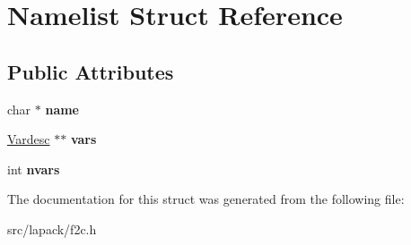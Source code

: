 \hypertarget{structNamelist}{\section{\-Namelist \-Struct \-Reference}
\label{structNamelist}
}
\subsection*{\-Public \-Attributes}
\begin{DoxyCompactItemize}
\item 
\hypertarget{structNamelist_a43f48d333d37610aa80483ee76c78d26}{char $\ast$ {\bfseries name}}\label{structNamelist_a43f48d333d37610aa80483ee76c78d26}

\item 
\hypertarget{structNamelist_a5e41f1eccfc8b25536f76c1ced89c3fc}{\hyperlink{structVardesc}{\-Vardesc} $\ast$$\ast$ {\bfseries vars}}\label{structNamelist_a5e41f1eccfc8b25536f76c1ced89c3fc}

\item 
\hypertarget{structNamelist_a30a6e0a05803290fed780890bcc436fa}{int {\bfseries nvars}}\label{structNamelist_a30a6e0a05803290fed780890bcc436fa}

\end{DoxyCompactItemize}


\-The documentation for this struct was generated from the following file\-:\begin{DoxyCompactItemize}
\item 
src/lapack/f2c.\-h\end{DoxyCompactItemize}
